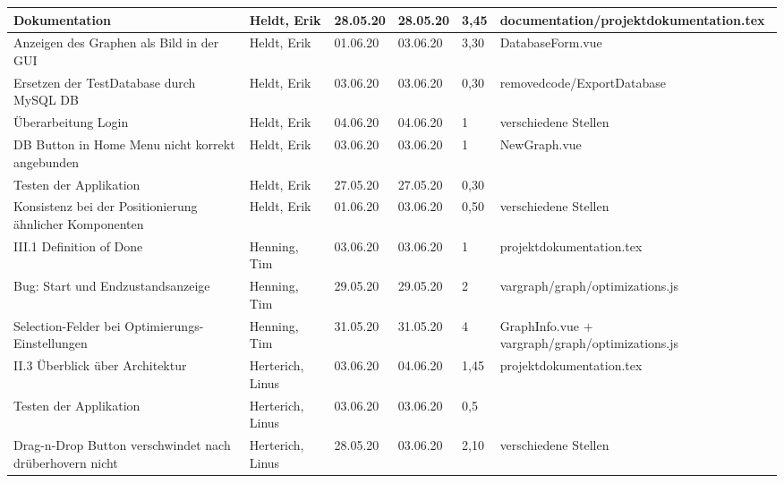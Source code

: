 \begin{longtable}{|p{4cm}|p{2cm}|p{1.2cm}|p{1.2cm}|p{0.7cm}|p{6.3cm}|}
  
  Dokumentation                                                         & Heldt, Erik           & 28.05.20 & 28.05.20 & 3,45  & documentation/projektdokumentation.tex                                                \\ \hline
  Anzeigen des Graphen als Bild in der GUI                              & Heldt, Erik           & 01.06.20 & 03.06.20 & 3,30  & DatabaseForm.vue                                              \\ \hline
  Ersetzen der TestDatabase durch MySQL DB                              & Heldt, Erik           & 03.06.20 & 03.06.20 & 0,30  & removedcode/ExportDatabase                                              \\ \hline
  Überarbeitung Login                                                   & Heldt, Erik           & 04.06.20 & 04.06.20 & 1     & verschiedene Stellen                                            \\ \hline
  DB Button in Home Menu nicht korrekt angebunden                       & Heldt, Erik           & 03.06.20 & 03.06.20 & 1     & NewGraph.vue                                            \\ \hline
  Testen der Applikation                                                & Heldt, Erik           & 27.05.20 & 27.05.20 & 0,30  &                                                    \\ \hline
  Konsistenz bei der Positionierung ähnlicher Komponenten               & Heldt, Erik           & 01.06.20 & 03.06.20 & 0,50  & verschiedene Stellen                                      \\ \hline

  III.1 Definition of Done                                              & Henning, Tim          & 03.06.20 & 03.06.20 & 1     & projektdokumentation.tex                                             \\ \hline
  Bug: Start und Endzustandsanzeige                                     & Henning, Tim          & 29.05.20 & 29.05.20 & 2     & vargraph/graph/optimizations.js                                                   \\ \hline
  Selection-Felder bei Optimierungs-Einstellungen                       & Henning, Tim          & 31.05.20 & 31.05.20 & 4     & GraphInfo.vue $+$ vargraph/graph/optimizations.js                                          \\ \hline

  II.3 Überblick über Architektur                                       & Herterich, Linus      & 03.06.20 & 04.06.20 & 1,45  & projektdokumentation.tex                                             \\ \hline
  Testen der Applikation                                                & Herterich, Linus      & 03.06.20 & 03.06.20 & 0,5   &                                           \\ \hline
  Drag-n-Drop Button verschwindet nach drüberhovern nicht               & Herterich, Linus      & 28.05.20 & 03.06.20 & 2,10  & verschiedene Stellen                                          \\ \hline
  

\end{longtable}
